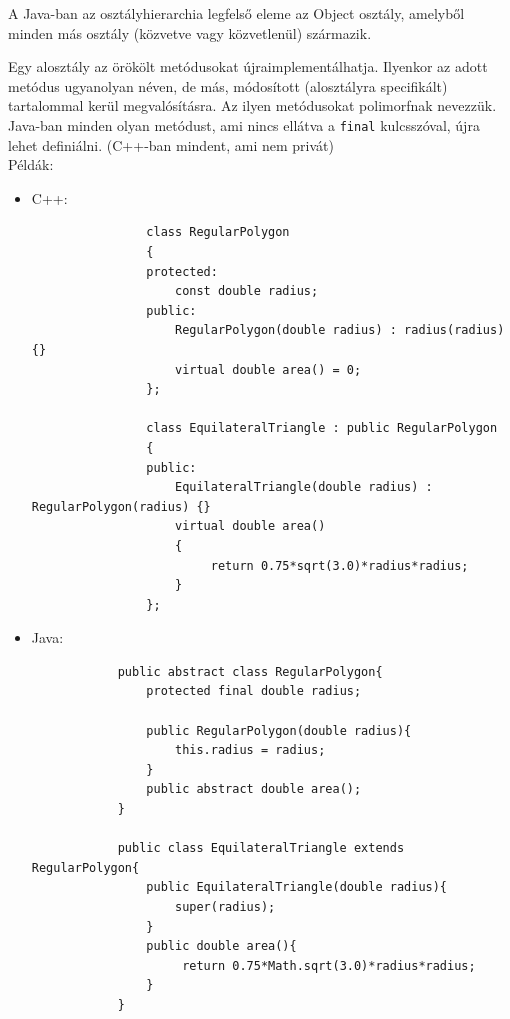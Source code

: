\documentclass[margin=0px]{article}
\begin{document}
A Java-ban az osztályhierarchia legfelső eleme az Object osztály, amelyből minden más osztály (közvetve vagy közvetlenül) származik.

Egy alosztály az örökölt metódusokat újraimplementálhatja. Ilyenkor az adott metódus ugyanolyan néven, de más, módosított (alosztályra specifikált) tartalommal kerül megvalósításra. Az ilyen metódusokat polimorfnak nevezzük. Java-ban minden olyan metódust, ami nincs ellátva a \texttt{final} kulcsszóval, újra lehet definiálni. (C++-ban mindent, ami nem privát)\\

\noindent Példák:
\begin{itemize}
    \item	C++:
          \begin{verbatim}
                class RegularPolygon
                {
                protected:
                    const double radius;
                public:
                    RegularPolygon(double radius) : radius(radius) {}
                    virtual double area() = 0;
                };
                
                class EquilateralTriangle : public RegularPolygon
                {
                public:
                    EquilateralTriangle(double radius) : RegularPolygon(radius) {}
                    virtual double area()
                    {
                         return 0.75*sqrt(3.0)*radius*radius;
                    }
                };
            \end{verbatim}

    \item	Java:
          \begin{verbatim}
            public abstract class RegularPolygon{
                protected final double radius;
            
                public RegularPolygon(double radius){
                    this.radius = radius;
                }
                public abstract double area();
            }
            
            public class EquilateralTriangle extends RegularPolygon{
                public EquilateralTriangle(double radius){
                    super(radius);
                }
                public double area(){
                     return 0.75*Math.sqrt(3.0)*radius*radius;
                }
            }
            
            \end{verbatim}
\end{itemize}
\end{document}
